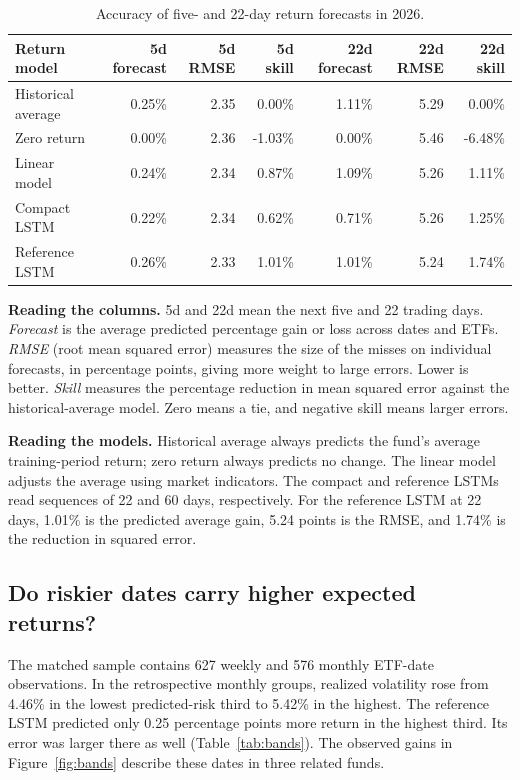 \documentclass[11pt]{article}
\begin{document}
\begin{table}[htbp]\centering\small\setlength{\tabcolsep}{4pt}\caption{Accuracy of five- and 22-day return forecasts in 2026.}\label{tab:returns}
\begin{tabular}{lrrrrrr}\toprule
Return model & 5d forecast & 5d RMSE & 5d skill & 22d forecast & 22d RMSE & 22d skill \\ \midrule
Historical average & 0.25\% & 2.35 & 0.00\% & 1.11\% & 5.29 & 0.00\% \\
Zero return & 0.00\% & 2.36 & -1.03\% & 0.00\% & 5.46 & -6.48\% \\
Linear model & 0.24\% & 2.34 & 0.87\% & 1.09\% & 5.26 & 1.11\% \\
Compact LSTM & 0.22\% & 2.34 & 0.62\% & 0.71\% & 5.26 & 1.25\% \\
Reference LSTM & 0.26\% & 2.33 & 1.01\% & 1.01\% & 5.24 & 1.74\% \\\bottomrule\end{tabular}\par\vspace{6pt}\begin{minipage}{.97\linewidth}\small\setlength{\parskip}{4pt}
\textbf{Reading the columns.} 5d and 22d mean the next five and 22 trading days. \emph{Forecast} is the average predicted percentage gain or loss across dates and ETFs. \emph{RMSE} (root mean squared error) measures the size of the misses on individual forecasts, in percentage points, giving more weight to large errors. Lower is better. \emph{Skill} measures the percentage reduction in mean squared error against the historical-average model. Zero means a tie, and negative skill means larger errors.

\textbf{Reading the models.} Historical average always predicts the fund's average training-period return; zero return always predicts no change. The linear model adjusts the average using market indicators. The compact and reference LSTMs read sequences of 22 and 60 days, respectively. For the reference LSTM at 22 days, 1.01\% is the predicted average gain, 5.24 points is the RMSE, and 1.74\% is the reduction in squared error.
\end{minipage}\end{table}
\subsection{Do riskier dates carry higher expected returns?}
The matched sample contains 627 weekly and 576 monthly ETF-date observations. In the retrospective monthly groups, realized volatility rose from 4.46\% in the lowest predicted-risk third to 5.42\% in the highest. The reference LSTM predicted only 0.25 percentage points more return in the highest third. Its error was larger there as well (Table~\ref{tab:bands}). The observed gains in Figure~\ref{fig:bands} describe these dates in three related funds.
\end{document}
